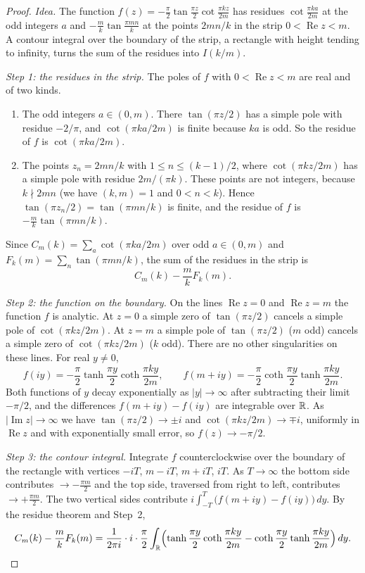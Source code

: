 \begin{proof}
\emph{Idea.} The function $f(z)=-\frac\pi2\tan\frac{\pi z}2\cot\frac{\pi kz}{2m}$ has residues $\cot\frac{\pi ka}{2m}$ at the odd integers $a$ and $-\frac mk\tan\frac{\pi mn}{k}$ at the points $2mn/k$ in the strip $0<\operatorname{Re}z<m$. A contour integral over the boundary of the strip, a rectangle with height tending to infinity, turns the sum of the residues into $I(k/m)$.

\emph{Step 1: the residues in the strip.} The poles of $f$ with $0<\operatorname{Re}z<m$ are real and of two kinds.
\begin{enumerate}[label=(\roman*),leftmargin=2em]
\item The odd integers $a\in(0,m)$. There $\tan(\pi z/2)$ has a simple pole with residue $-2/\pi$, and $\cot(\pi ka/2m)$ is finite because $ka$ is odd. So the residue of $f$ is $\cot(\pi ka/2m)$.
\item The points $z_n=2mn/k$ with $1\le n\le(k-1)/2$, where $\cot(\pi kz/2m)$ has a simple pole with residue $2m/(\pi k)$. These points are not integers, because $k\nmid2mn$ (we have $(k,m)=1$ and $0<n<k$). Hence $\tan(\pi z_n/2)=\tan(\pi mn/k)$ is finite, and the residue of $f$ is $-\frac mk\tan(\pi mn/k)$.
\end{enumerate}
Since $C_m(k)=\sum_{a}\cot(\pi ka/2m)$ over odd $a\in(0,m)$ and $F_k(m)=\sum_n\tan(\pi mn/k)$, the sum of the residues in the strip is
\[
C_m(k)-\frac mkF_k(m).
\]

\emph{Step 2: the function on the boundary.} On the lines $\operatorname{Re}z=0$ and $\operatorname{Re}z=m$ the function $f$ is analytic. At $z=0$ a simple zero of $\tan(\pi z/2)$ cancels a simple pole of $\cot(\pi kz/2m)$. At $z=m$ a simple pole of $\tan(\pi z/2)$ ($m$ odd) cancels a simple zero of $\cot(\pi kz/2m)$ ($k$ odd). There are no other singularities on these lines. For real $y\ne0$,
\[
f(iy)=-\frac\pi2\tanh\frac{\pi y}2\coth\frac{\pi ky}{2m},\qquad f(m+iy)=-\frac\pi2\coth\frac{\pi y}2\tanh\frac{\pi ky}{2m}.
\]
Both functions of $y$ decay exponentially as $|y|\to\infty$ after subtracting their limit $-\pi/2$, and the differences $f(m+iy)-f(iy)$ are integrable over $\mathbb{R}$. As $|\operatorname{Im}z|\to\infty$ we have $\tan(\pi z/2)\to\pm i$ and $\cot(\pi kz/2m)\to\mp i$, uniformly in $\operatorname{Re}z$ and with exponentially small error, so $f(z)\to-\pi/2$.

\emph{Step 3: the contour integral.} Integrate $f$ counterclockwise over the boundary of the rectangle with vertices $-iT$, $m-iT$, $m+iT$, $iT$. As $T\to\infty$ the bottom side contributes $\to-\frac{\pi m}2$ and the top side, traversed from right to left, contributes $\to+\frac{\pi m}2$. The two vertical sides contribute $i\int_{-T}^T\bigl(f(m+iy)-f(iy)\bigr)\,dy$. By the residue theorem and Step~2,
\[
C_m(k)-\frac mkF_k(m)=\frac1{2\pi i}\cdot i\cdot\frac\pi2\int_{\mathbb{R}}\Bigl(\tanh\frac{\pi y}2\coth\frac{\pi ky}{2m}-\coth\frac{\pi y}2\tanh\frac{\pi ky}{2m}\Bigr)\,dy.
\]


\end{proof}
